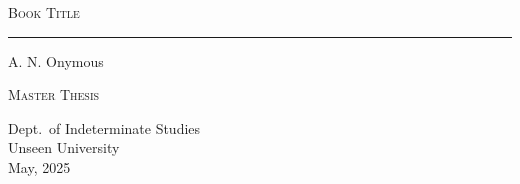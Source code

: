 \documentclass[a4paper,english,12pt,final]{memoir}
\begin{document}
\frontmatter*

\thispagestyle{empty}

\vfill

\begin{center}
  \Huge{\scshape Book Title}
\end{center}
\vspace{2ex}
\noindent\rule{\textwidth}{1pt}
\vspace{2ex}

\begin{flushright}
  \Large{A. N. Onymous}
\end{flushright}

\vspace{2cm}

\begin{center}
  \Large{\scshape Master Thesis}
\end{center}

\vfill


\begin{center}
\Large{Dept.~of Indeterminate Studies\\
Unseen University\\
May, 2025}
\end{center}


\newpage
\tableofcontents
\newpage


\mainmatter*


\backmatter*
\end{document}
